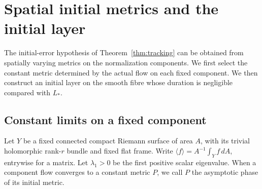 \section{Spatial initial metrics and the initial layer}\label{sec:entry}

The initial-error hypothesis of Theorem~\ref{thm:tracking}
can be obtained from spatially varying metrics on the
normalization components. We first select the constant
metric determined by the actual flow on each fixed
component. We then construct an initial layer on the
smooth fibre whose duration is negligible compared
with $L_*$.

\subsection{Constant limits on a fixed component}
Let $Y$ be a fixed connected compact Riemann surface
of area $A$, with its trivial holomorphic rank-$r$
bundle and fixed flat frame. Write
$\langle f\rangle=A^{-1}\int_Y f\,dA$, entrywise
for a matrix. Let $\lambda_1>0$ be the first
positive scalar eigenvalue.
When a component flow converges to a constant
metric $P$, we call $P$ the asymptotic phase
of its initial metric.

